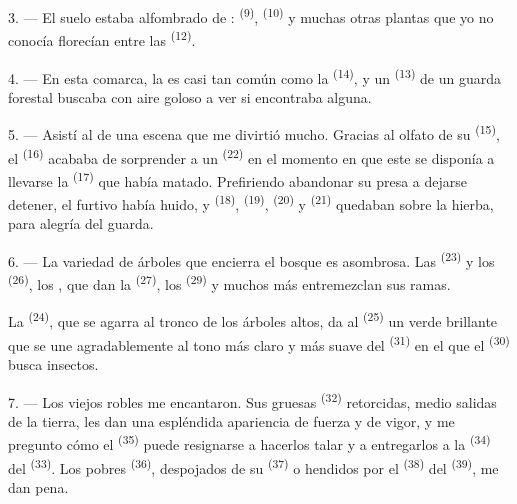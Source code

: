3. --- El suelo estaba alfombrado de :
 \textsuperscript{(9)},  \textsuperscript{(10)} y
muchas otras plantas que yo no conocía florecían entre las  \textsuperscript{(12)}.

4. --- En esta comarca, la  es casi tan común como la
 \textsuperscript{(14)}, y un  \textsuperscript{(13)} de un
guarda forestal buscaba con aire goloso a ver si encontraba alguna.

\VUsaut{3.0mm}
\VUsaut{3.0mm}

5. --- Asistí al  de una escena que me divirtió mucho. Gracias
al olfato de su  \textsuperscript{(15)}, el  \textsuperscript{(16)} acababa de sorprender a un 
\textsuperscript{(22)} en el momento en que este se disponía a llevarse la
 \textsuperscript{(17)} que había matado. Prefiriendo abandonar su presa
a dejarse detener, el furtivo había huido, y  \textsuperscript{(18)},
 \textsuperscript{(19)},  \textsuperscript{(20)} y
 \textsuperscript{(21)} quedaban sobre la hierba, para alegría del
guarda.

6. --- La variedad de árboles que encierra el bosque es asombrosa. Las
 \textsuperscript{(23)} y los  \textsuperscript{(26)}, los
, que dan la  \textsuperscript{(27)}, los 
\textsuperscript{(29)} y muchos más entremezclan sus ramas.

La  \textsuperscript{(24)}, que se agarra al tronco de los árboles
altos, da al  \textsuperscript{(25)} un verde brillante que se une
agradablemente al tono más claro y más suave del 
\textsuperscript{(31)} en el que el  \textsuperscript{(30)} busca insectos.

\VUsaut{3.0mm}
\VUsaut{3.0mm}

7. --- Los viejos robles me encantaron. Sus gruesas 
\textsuperscript{(32)} retorcidas, medio salidas de la tierra, les dan una
espléndida apariencia de fuerza y de vigor, y me pregunto cómo el
 \textsuperscript{(35)} puede resignarse a hacerlos talar y a
entregarlos a la  \textsuperscript{(34)} del 
\textsuperscript{(33)}. Los pobres  \textsuperscript{(36)}, despojados de su
 \textsuperscript{(37)} o hendidos por el 
\textsuperscript{(38)} del  \textsuperscript{(39)}, me dan pena.

